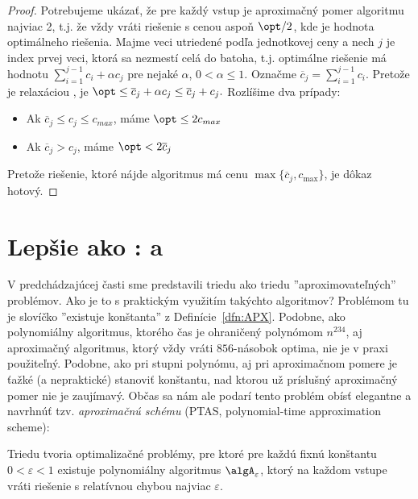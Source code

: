 \begin{proof}
Potrebujeme ukázať, že pre každý vstup je aproximačný pomer algoritmu \algA najviac 2, t.j. že 
vždy vráti riešenie s cenou aspoň $\opt/2$, kde \opt je hodnota optimálneho riešenia. 
Majme veci utriedené podľa
jednotkovej ceny a nech $j$ je index prvej veci, ktorá sa nezmestí celá do batoha, t.j. optimálne
riešenie \Qknapsack má hodnotu $\sum_{i=1}^{j-1}c_i+\alpha c_j$ pre nejaké $\alpha$, $0<\alpha\le 1$.
  Označme $\overline{c}_j=\sum_{i=1}^{j-1}c_i$.
  Pretože \Qknapsack je relaxáciou \knapsack, je $\opt\le\overline{c}_j+\alpha c_j\le\overline{c}_j+c_j.$
Rozlíšime dva prípady:

\begin{itemize}
\item Ak $\overline{c}_j\le c_j\le c_{max}$, máme $\opt\le2c_{max}$
\item Ak $\overline{c}_j> c_j$, máme $\opt<2\overline{c}_j$
\end{itemize}

\noindent
  Pretože riešenie, ktoré nájde algoritmus \algA má cenu $\max\{\overline{c}_j,c_{\max}\}$, je dôkaz hotový.

\end{proof}

\section*{Lepšie ako \APX: \PTAS a \FPTAS}

V predchádzajúcej časti sme predstavili triedu \APX ako triedu
''aproximovateľných'' problémov. Ako je to s praktickým využitím takýchto
algoritmov? Problémom tu je slovíčko ''existuje konštanta'' z
Definície~\ref{dfn:APX}. Podobne, ako polynomiálny algoritmus, ktorého čas je ohraničený polynómom $n^{234}$,
aj aproximačný algoritmus, ktorý vždy vráti $856$-násobok optima, nie je v praxi použiteľný. Podobne, ako
pri stupni polynómu, aj pri aproximačnom pomere je ťažké (a nepraktické) stanoviť konštantu, nad ktorou už
príslušný aproximačný pomer nie je zaujímavý. Občas sa nám ale podarí tento problém obísť elegantne a navrhnúť
tzv. {\em aproximačnú schému} (PTAS, polynomial-time approximation scheme):

\begin{framed}
  \begin{dfn}
    \label{dfn:PTAS}
    Triedu \PTAS tvoria optimalizačné problémy, 
    pre ktoré pre každú fixnú konštantu $0<\varepsilon<1$
    existuje polynomiálny algoritmus $\algA_\varepsilon$,
    ktorý na každom vstupe vráti riešenie s relatívnou chybou najviac $\varepsilon$.
  \end{dfn}
\end{framed}


